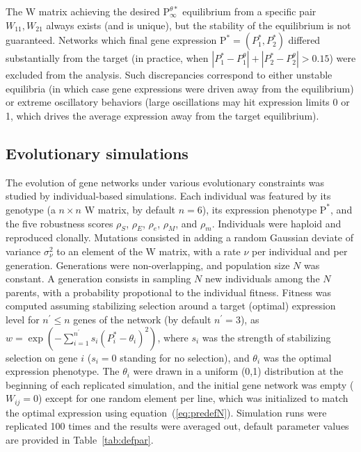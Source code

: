 \documentclass[10pt,a4paper]{article}
\newcommand{\stability}{{\rho_S}}
\newcommand{\earlyenv}{{\rho_E}}
\newcommand{\lateenv}{{\rho_e}}
\newcommand{\earlymut}{{\rho_M}}
\newcommand{\latemut}{{\rho_m}}
\newcommand{\W}{\bm{\mathrm W}}
\newcommand{\Pp}{\bm{\mathrm P}}
\begin{document}
The $\W$ matrix achieving the desired $\Pp^{\theta \ast}_\infty$ equilibrium from a specific pair $W_{11}, W_{21}$ always exists (and is unique), but the stability of the equilibrium is not guaranteed. Networks which final gene expression $\Pp^\ast = (P^\ast_1,P^\ast_2)$ differed substantially from the target (in practice, when $|P^\ast_1 - P^{\theta}_1| + |P^\ast_2 - P^{\theta}_2| > 0.15$) were excluded from the analysis. Such discrepancies correspond to either unstable equilibria (in which case gene expressions were driven away from the equilibrium) or extreme oscillatory behaviors (large oscillations may hit expression limits 0 or 1, which drives the average expression away from the target equilibrium). 

\subsection{Evolutionary simulations}

The evolution of gene networks under various evolutionary constraints was studied by individual-based simulations. Each individual was featured by its genotype (a $n \times n$ $\W$ matrix, by default $n=6$), its expression phenotype $\Pp^*$, and the five robustness scores $\stability$, $\earlyenv$, $\lateenv$, $\earlymut$, and $\latemut$. Individuals were haploid and reproduced clonally. Mutations consisted in adding a random Gaussian deviate of variance $\sigma_\nu^2$ to an element of the $\W$ matrix, with a rate $\nu$ per individual and per generation. Generations were non-overlapping, and population size $N$ was constant. A generation consists in sampling $N$ new individuals among the $N$ parents, with a probability propotional to the individual fitness. Fitness was computed assuming stabilizing selection around a target (optimal) expression level for $n^\prime \leq n$ genes of the network (by default $n^\prime=3$), as $w = \exp(- \sum_{i=1}^{n^\prime} s_i (P_i^* - \theta_i)^2 )$, where $s_i$ was the strength of stabilizing selection on gene $i$ ($s_i = 0$ standing for no selection), and $\theta_i$ was the optimal expression phenotype. The $\theta_i$ were drawn in a uniform (0,1) distribution at the beginning of each replicated simulation, and the initial gene network was empty ($W_{ij} = 0$) except for one random element per line, which was initialized to match the optimal expression using equation~(\ref{eq:predefN}). Simulation runs were replicated 100 times and the results were averaged out, default parameter values are provided in Table~\ref{tab:defpar}. 
\end{document}

